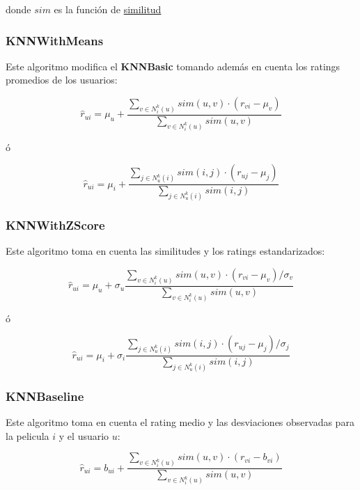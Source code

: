 \documentclass{article}
\begin{document}
donde $sim$ es la función de \href{https://surprise.readthedocs.io/en/stable/similarities.html#module-surprise.similarities}{similitud}


\subsubsection{KNNWithMeans}

Este algoritmo modifica el \textbf{KNNBasic} tomando además en cuenta los ratings promedios de los usuarios:

\begin{equation}
\hat r_{ui}=\mu_u + \frac{\sum_{v\in N_i^k(u)}sim(u,v) \cdot (r_{vi}-\mu_v)}{\sum_{v\in N_i^k(u)}sim(u,v)}
\end{equation}

ó

\begin{equation}
\hat r_{ui}=\mu_i + \frac{\sum_{j\in N_u^k(i)}sim(i,j) \cdot (r_{uj}-\mu_j)}{\sum_{j\in N_u^k(i)}sim(i,j)}
\end{equation}

\subsubsection{KNNWithZScore}

Este algoritmo toma en cuenta las similitudes y los ratings estandarizados:

\begin{equation}
\hat r_{ui}=\mu_u + \sigma_u\frac{\sum_{v\in N_i^k(u)}sim(u,v) \cdot (r_{vi}-\mu_v)/\sigma_v}{\sum_{v\in N_i^k(u)}sim(u,v)}
\end{equation}

ó

\begin{equation}
\hat r_{ui}=\mu_i + \sigma_i \frac{\sum_{j\in N_u^k(i)}sim(i,j) \cdot (r_{uj}-\mu_j)/\sigma_j}{\sum_{j\in N_u^k(i)}sim(i,j)}
\end{equation}


\subsubsection{KNNBaseline}

Este algoritmo toma en cuenta el rating medio y las desviaciones observadas para la pelicula $i$ y el usuario $u$:

\begin{equation}
\hat r_{ui}=b_{ui} + \frac{\sum_{v\in N_i^k(u)}sim(u,v) \cdot (r_{vi}-b_{vi})}{\sum_{v\in N_i^k(u)}sim(u,v)}
\end{equation}
\end{document}
